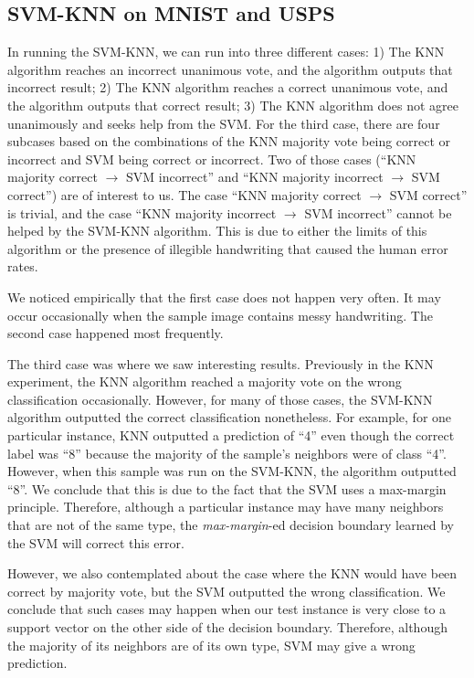 \documentclass[11pt,letterpaper]{article}
\begin{document}
\subsection{SVM-KNN on MNIST and USPS}

In running the SVM-KNN, we can run into three different cases: 1) The KNN algorithm reaches an incorrect unanimous vote, and the algorithm outputs that incorrect result; 2) The KNN algorithm reaches a correct unanimous vote, and the algorithm outputs that correct result; 3) The KNN algorithm does not agree unanimously and seeks help from the SVM. For the third case, there are four subcases based on the combinations of the KNN majority vote being correct or incorrect and SVM being correct or incorrect. Two of those cases (``KNN majority correct $\rightarrow$ SVM incorrect'' and ``KNN majority incorrect $\rightarrow$ SVM correct'') are of interest to us. The case ``KNN majority correct $\rightarrow$ SVM correct'' is trivial, and the case ``KNN majority incorrect $\rightarrow$ SVM incorrect'' cannot be helped by the SVM-KNN algorithm. This is due to either the limits of this algorithm or the presence of illegible handwriting that caused the human error rates.

We noticed empirically that the first case does not happen very often. It may occur occasionally when the sample image contains messy handwriting. The second case happened most frequently.

The third case was where we saw interesting results. Previously in the KNN experiment, the KNN algorithm reached a majority vote on the wrong classification occasionally. However, for many of those cases, the SVM-KNN algorithm outputted the correct classification nonetheless. For example, for one particular instance, KNN outputted a prediction of ``4'' even though the correct label was ``8'' because the majority of the sample's neighbors were of class ``4''. However, when this sample was run on the SVM-KNN, the algorithm outputted ``8''. We conclude that this is due to the fact that the SVM uses a max-margin principle. Therefore, although a particular instance may have many neighbors that are not of the same type, the \textit{max-margin}-ed decision boundary learned by the SVM will correct this error.

However, we also contemplated about the case where the KNN would have been correct by majority vote, but the SVM outputted the wrong classification. We conclude that such cases may happen when our test instance is very close to a support vector on the other side of the decision boundary. Therefore, although the majority of its neighbors are of its own type, SVM may give a wrong prediction.
\end{document}
